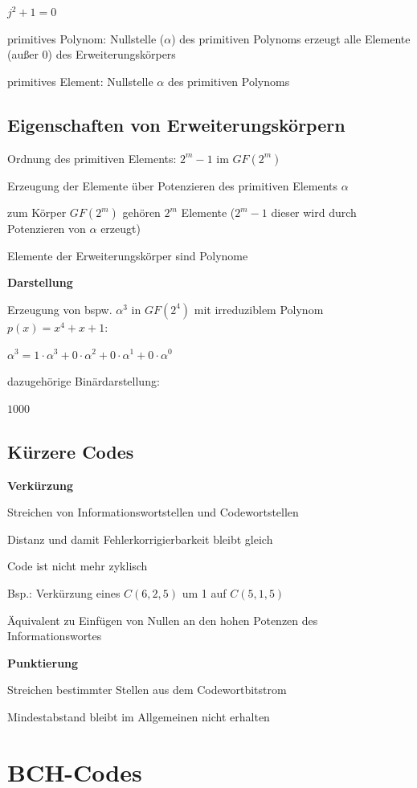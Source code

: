 $\displaystyle{
    j^2 + 1 = 0
}$

primitives Polynom: Nullstelle ($\alpha$) des primitiven Polynoms erzeugt alle Elemente (außer 0) des Erweiterungskörpers

primitives Element: Nullstelle $\alpha$ des primitiven Polynoms

\subsection{Eigenschaften von Erweiterungskörpern}

Ordnung des primitiven Elements: $2^m - 1$ im $GF(2^m)$

Erzeugung der Elemente über Potenzieren des primitiven Elements $\alpha$

zum Körper $GF(2^m)$ gehören $2^m$ Elemente ($2^m - 1$ dieser wird durch Potenzieren von $\alpha$ erzeugt)

Elemente der Erweiterungskörper sind Polynome

\textbf{Darstellung}

Erzeugung von bspw. $\alpha^3$ in $GF(2^4)$ mit irreduziblem Polynom $p(x) = x^4 + x + 1$:

$\displaystyle{
    \alpha^3 = 1 \cdot \alpha^3 + 0 \cdot \alpha^2 + 0 \cdot \alpha^1 + 0 \cdot \alpha^0
}$

dazugehörige Binärdarstellung:

$1000$

\subsection{Kürzere Codes}

\textbf{Verkürzung}

Streichen von Informationswortstellen und Codewortstellen

Distanz und damit Fehlerkorrigierbarkeit bleibt gleich

Code ist nicht mehr zyklisch

Bsp.: Verkürzung eines $C(6, 2, 5)$ um 1 auf $C(5, 1, 5)$

Äquivalent zu Einfügen von Nullen an den hohen Potenzen des Informationswortes

\textbf{Punktierung}

Streichen bestimmter Stellen aus dem Codewortbitstrom

Mindestabstand bleibt im Allgemeinen nicht erhalten

\section{BCH-Codes}

